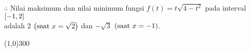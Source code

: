 \begin{enumerate}[leftmargin=*, label={\arabic*}.]
$\therefore$ Nilai maksimum dan nilai minimum fungsi $f(t)=t\sqrt{4-t^2}$ pada 
interval $\cic{-1,2}$ \\
adalah $2$ $\brk*{\text{saat $x = \sqrt{2}$}}$ 
dan $-\sqrt{3}$ $\brk*{\text{saat $x = -1$}}$.

\end{enumerate}

\begin{center}\line(1,0){300}\end{center}
